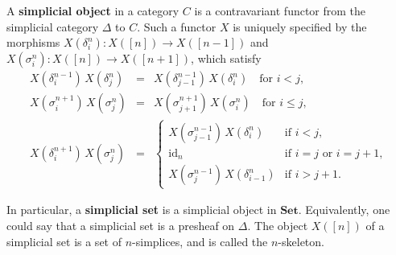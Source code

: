 \documentclass[12pt]{article}
\newcommand*{\mathcat}[1]{\mathord{\mathbf{#1}}}
\newcommand*{\id}{\mathrm{id}}
\theoremstyle{inlinedefn}
\theoremstyle{break}
\begin{document}
A \textbf{simplicial object} in a category $C$ is a contravariant functor from
the simplicial category $\Delta$ to $C$.
Such a functor $X$ is uniquely specified by the morphisms
$X(\delta^n_i)\colon X([n]) \to X([n-1])$ and $X(\sigma^n_i)\colon X([n]) \to X([n+1])$,
which satisfy
\begin{eqnarray}
X(\delta^{n-1}_i)\,X(\delta^n_j) & = & X(\delta^{n-1}_{j-1})\,X(\delta^n_i)
\quad\mbox{for\ } i<j, \\
X(\sigma^{n+1}_i)\,X(\sigma^n_j) & = & X(\sigma^{n+1}_{j+1})\,X(\sigma^n_i)
\quad\mbox{for\ } i\leq j, \\
X(\delta^{n+1}_i)\,X(\sigma^n_j) & = & \left\{
\begin{array}{ll}
X(\sigma^{n-1}_{j-1})\,X(\delta^n_i) & \mbox{if\ } i<j, \\
\id_n & \mbox{if\ } i=j \mbox{\ or\ } i=j+1, \\
X(\sigma^{n-1}_j)\,X(\delta^n_{i-1}) & \mbox{if\ } i>j+1.
\end{array}\right.
\end{eqnarray}

In particular, a \textbf{simplicial set} is a simplicial object in $\mathcat{Set}$.
Equivalently, one could say that a simplicial set is a presheaf on $\Delta$.
The object $X([n])$ of a simplicial set is a set of $n$-simplices,
and is called the $n$-skeleton.
\end{document}
